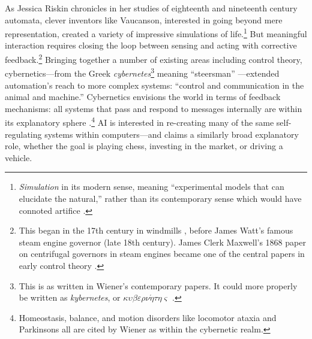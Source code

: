 

As Jessica Riskin chronicles in her studies of eighteenth and
nineteenth century automata, clever inventors like Vaucanson, interested in going
beyond mere representation, created a variety of impressive
simulations of life.\footnote{\emph{Simulation} in its modern sense, meaning
``experimental models that can elucidate the natural,'' rather than its
contemporary sense which would have connoted artifice \cite[p.
  605--606]{riskinDuck}.} But meaningful interaction requires closing the loop between
sensing and acting with corrective feedback.\footnote{This began in
  the 17th century in windmills \cite{richardhills}, before James
  Watt's famous steam engine governor
(late 18th century). James Clerk Maxwell's 1868 paper on centrifugal
 governors in steam engines became one of the central papers in early
 control theory \cite{ottomayr}.} Bringing together a number of existing
 areas including control theory,
 cybernetics---from the Greek \emph{cybernetes}\footnote{This is as
   written in Wiener's contemporary papers. It could more properly be written
   as \emph{kybernetes}, or 
   $\kappa\upsilon\beta\varepsilon\rho\nu\acute{\eta}\tau\eta\varsigma$
   \cite[p. 11]{cybernetics}.} meaning 
 ``steersman'' \cite[p. 6]{wienerMainIdeas}---extended automation's reach to more complex
 systems: ``control and communication in the animal and machine.''
 Cybernetics envisions the world in 
 terms of feedback mechanisms: all systems that pass and respond to
 messages internally are within its explanatory sphere \cite[p.
   10-15]{wienerMainIdeas}.\footnote{Homeostasis, balance, and motion
 disorders like locomotor ataxia and Parkinsons all are cited by
 Wiener as within the cybernetic realm.}
 AI is interested in re-creating many of the same
 self-regulating systems within computers---and claims a
 similarly broad explanatory role, whether the goal is playing chess,
 investing in the market, or driving a vehicle. 


